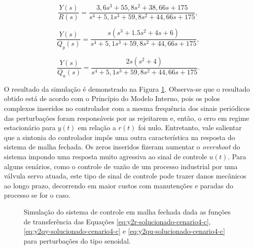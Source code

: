 \begin{equation}
    \label{eq:y2r-solucionado-cenario4-c}
    \frac{Y(s)}{R(s)} = \frac{3,6s^3 + 55,8s^2 + 38,66s + 175}
    {s^4 + 5,1s^3 + 59,8s^2 + 44,66s + 175},
\end{equation}

\begin{equation}
    \label{eq:y2qy-solucionado-cenario4-c}
    \frac{Y(s)}{Q_{y}(s)} = \frac{s(s^3 + 1.5s^2 + 4s + 6)}
    {s^4 + 5,1s^3 + 59,8s^2 + 44,66s + 175},
\end{equation}

\begin{equation}
    \label{eq:y2qu-solucionado-cenario4-c}
    \frac{Y(s)}{Q_{u}(s)} = \frac{ 2s(s^2 + 4)}
    {s^4 + 5,1s^3 + 59,8s^2 + 44,66s + 175}.
\end{equation}

O resultado da simulação é demonstrado na Figura
\ref{fig:resultado-cenario4-c}. Observa-se que o resultado obtido está
de acordo com o Princípio do Modelo Interno, pois os polos complexos inseridos
no controlador com a mesma frequência dos sinais periódicos das perturbações
foram responsáveis por as rejeitarem e, então, o erro em regime estacionário
para $y(t)$ em relação a $r(t)$ foi nulo. Entretanto, vale salientar que a
sintonia do controlador impôs uma outra característica na resposta do sistema de
malha fechada. Os zeros inseridos fizeram aumentar o \textit{overshoot} do sistema
impondo uma resposta muito agressiva ao sinal de controle $u(t)$. Para alguns
cenários, como o controle de vazão de um processo industrial por uma válvula
servo atuada, este tipo de sinal de controle pode trazer danos mecânicos ao
longo prazo, decorrendo em maior custos com manutenções e paradas do processo
se for o caso.

\begin{figure}[!ht]
    \caption{Simulação do sistema de controle em malha fechada dada as funções
    de transferência das Equações
    \ref{eq:y2r-solucionado-cenario4-c}, \ref{eq:y2qy-solucionado-cenario4-c} e
    \ref{eq:y2qu-solucionado-cenario4-c} para perturbações do tipo senoidal.}
    \vspace{-10pt}
    \hspace{-30pt}
    \label{fig:resultado-cenario4-c}
    \begin{minipage}{\linewidth}
        
    \end{minipage}
\end{figure}
